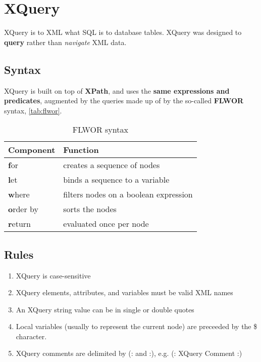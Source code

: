 \documentclass[slides]{pgnotes}
\begin{document}
\section{XQuery}

XQuery is to XML what SQL is to database tables.
XQuery was designed to \textbf{query} rather than \textit{navigate} XML data.

\subsection{Syntax}

XQuery is built on top of \textbf{XPath}, and uses the \textbf{same expressions and predicates},  
augmented by the queries made up of by the so-called \textbf{FLWOR} syntax, \autoref{tab:flwor}.

\begin{table}[htbp]
  \begin{tabularx}{1.0\linewidth}{l X}
    \toprule
    \textbf{Component} & \textbf{Function} \\
    \midrule
    \textbf{f}or & creates a sequence of nodes \\
    \textbf{l}et & binds a sequence to a variable \\
    \textbf{w}here & filters nodes on a boolean expression \\
    \textbf{o}rder by & sorts the nodes \\
    \textbf{r}eturn & evaluated once per node \\
    \bottomrule
  \end{tabularx}
  \caption{FLWOR syntax}
  \label{tab:flwor}
\end{table}


\subsection{Rules}

\begin{enumerate}
\item XQuery is case-sensitive
\item XQuery elements, attributes, and variables must be valid XML names
\item An XQuery string value can be in single or double quotes
\item Local variables (usually to represent the current node) are preceeded by the \$ character. 
\item XQuery comments are delimited by (: and :), e.g. (: XQuery Comment :)
\end{enumerate}
\end{document}
